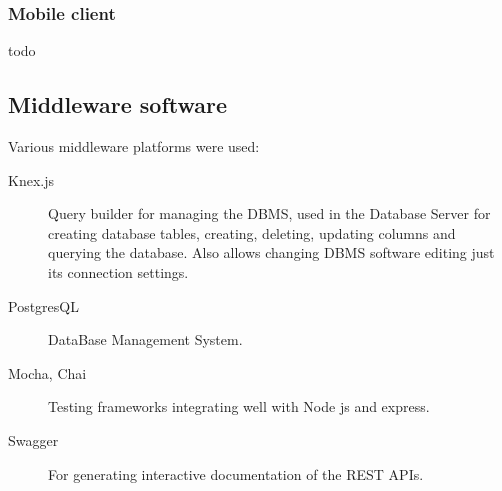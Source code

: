 \documentclass[../main.tex]{subfiles}
\begin{document}
\subsubsection{Mobile client}

todo



\subsection{Middleware software}

Various middleware platforms were used:

{\begin{description}
	\item [Knex.js] Query builder for managing the DBMS, used in the Database Server for creating database tables, creating, deleting, updating columns and querying the database. Also allows changing DBMS software editing just its connection settings.
	\item [PostgresQL] DataBase Management System.
	\item [Mocha, Chai] Testing frameworks integrating well with Node js and express.
	\item [Swagger] For generating interactive documentation of the REST APIs.
\end{description}}
\end{document}
